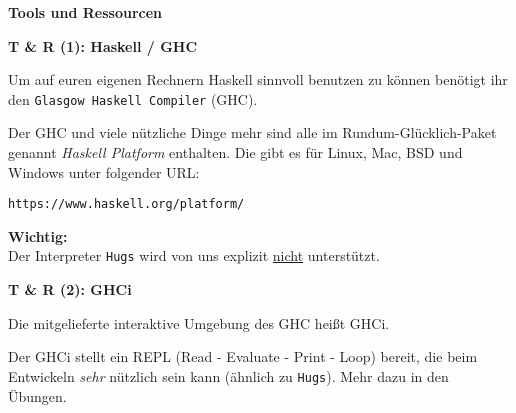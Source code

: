 \documentclass{beamer}
\begin{document}
  
  \begin{frame}

    \begin{center}
    \Large\textbf{Tools und Ressourcen}
    \end{center}
  \end{frame}
  
  
  \begin{frame}
    \begin{center}
    \Large\textbf{T \& R (1): Haskell / GHC}\\ \bigskip \normalsize
    
    Um auf euren eigenen Rechnern Haskell sinnvoll benutzen zu können benötigt ihr den \texttt{Glasgow Haskell Compiler} (GHC). \bigskip
    
    Der GHC und viele nützliche Dinge mehr sind alle im Rundum-Glücklich-Paket genannt \emph{Haskell Platform} enthalten. Die gibt es für Linux, Mac, BSD und Windows unter folgender URL:
    
    \bigskip\texttt{https://www.haskell.org/platform/}\smallskip
    
    \begin{important}
    \textbf{Wichtig:}\\ Der Interpreter \texttt{Hugs} wird von uns explizit \underline{nicht} unterstützt.
    \end{important}
    \end{center}
  \end{frame}
  
  
  \begin{frame}
    \begin{center}
    \Large\textbf{T \& R (2): GHCi}\\ \bigskip \normalsize
    
    Die mitgelieferte interaktive Umgebung des GHC heißt GHCi.\\\bigskip
    
    \bigskip Der GHCi stellt ein REPL (Read - Evaluate - Print - Loop) bereit, die beim Entwickeln \emph{sehr} nützlich sein kann (ähnlich zu \texttt{Hugs}). Mehr dazu in den Übungen.
    \end{center}
  \end{frame}
  
\end{document}
